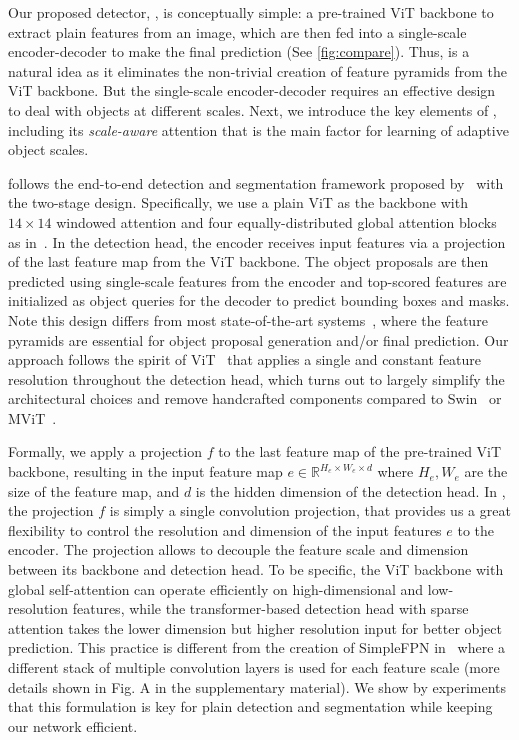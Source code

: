 Our proposed detector, \ours, is conceptually simple: a pre-trained ViT backbone to extract plain features from an image, which are then fed into a single-scale encoder-decoder to make the final prediction (See \cref{fig:compare}). Thus, \ours is a natural idea as it eliminates the non-trivial creation of feature pyramids from the ViT backbone. But the single-scale encoder-decoder requires an effective design to deal with objects at different scales. Next, we introduce the key elements of \ours, including its \emph{scale-aware} attention that is the main factor for learning of adaptive object scales.


 \ours follows the end-to-end detection and segmentation framework proposed by~\cite{zhu2021deformable,nguyen2022boxer} with the two-stage design. Specifically, we use a plain ViT as the backbone with $14\times14$ windowed attention and four equally-distributed global attention blocks as in~\cite{li2022vitdet}. In the detection head, the \ours encoder receives input features via a projection of the last feature map from the ViT backbone. The object proposals are then predicted using single-scale features from the encoder and top-scored features are initialized as object queries for the \ours decoder to predict bounding boxes and masks. Note this design differs from most state-of-the-art systems~\cite{cheng2022mask2former,li2022vitdet,lin2023plaindetr}, where the feature pyramids are essential for object proposal generation and/or final prediction. Our approach follows the spirit of ViT~\cite{dosovitskiy2021vit} that applies a single and constant feature resolution throughout the detection head, which turns out to largely simplify the architectural choices and remove handcrafted components compared to Swin~\cite{liu2021swintransformer} or MViT~\cite{fan2021mvit}.

Formally, we apply a projection $f$ to the last feature map of the pre-trained ViT backbone, resulting in the input feature map $e \in \mathbb{R}^{H_e \times W_e \times d}$ where $H_e, W_e$ are the size of the feature map, and $d$ is the hidden dimension of the detection head. In \ours, the projection $f$ is simply a single convolution projection, that provides us a great flexibility to control the resolution and dimension of the input features $e$ to the encoder. The projection allows \ours to decouple the feature scale and dimension between its backbone and detection head. To be specific, the ViT backbone with global self-attention can operate efficiently on high-dimensional and low-resolution features, while the transformer-based detection head with sparse attention takes the lower dimension but higher resolution input for better object prediction. This practice is different from the creation of SimpleFPN in~\cite{li2022vitdet} where a different stack of multiple convolution layers is used for each feature scale (more details shown in Fig. A in the supplementary material). We show by experiments that this formulation is key for plain detection and segmentation while keeping our network efficient.

